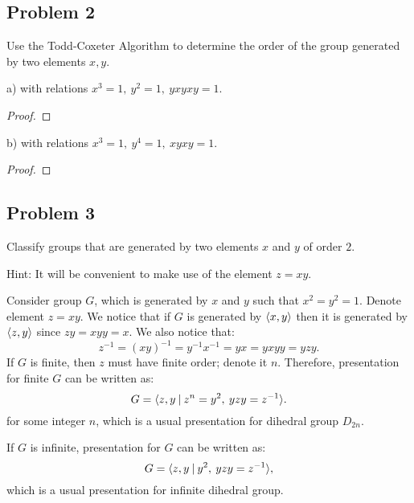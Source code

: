 \documentclass{article}
\theoremstyle{definition}
\DeclarePairedDelimiter\genby{\langle}{\rangle}
\begin{document}
\subsection*{Problem 2}

\begin{tcolorbox}
Use the Todd-Coxeter Algorithm to determine the order of the group generated by two elements $x, y$.

a) with relations $x^3 = 1, \> y^2 = 1, \> yxyxy = 1$.
\end{tcolorbox}
\begin{proof}
\end{proof}

\begin{tcolorbox}
b) with relations $x^3 = 1, \> y^4 = 1, \> xyxy = 1$.
\end{tcolorbox}
\begin{proof}
\end{proof}


\subsection*{Problem 3}

\begin{tcolorbox}
Classify groups that are generated by two elements $x$ and $y$ of order $2$.

Hint: It will be convenient to make use of the element $z = xy$.
\end{tcolorbox}

Consider group $G$, which is generated by $x$ and $y$ such that $x^2 = y^2 = 1$.
Denote element $z = xy$.
We notice that if $G$ is generated by $\genby{x,y}$ then it is generated by $\genby{z, y}$ since $zy = xyy = x$.
We also notice that:
\[
    z^{-1} = (xy)^{-1} = y^{-1} x^{-1} = yx = yxyy = yzy.
\]
If $G$ is finite, then $z$ must have finite order; denote it $n$.
Therefore, presentation for finite $G$ can be written as:
\[
    G = \genby{z, y \> | \> z^n = y^2, \> yzy = z^{-1}}.
\]
for some integer $n$, which is a usual presentation for dihedral group $D_{2n}$.

If $G$ is infinite, presentation for $G$ can be written as:
\[
    G = \genby{z, y \> | \> y^2, \> yzy = z^{-1}},
\]
which is a usual presentation for infinite dihedral group.
\end{document}
